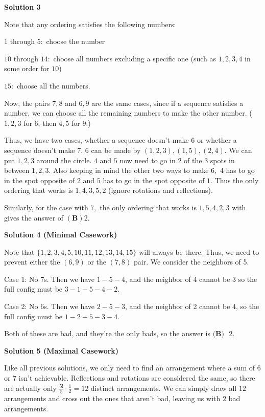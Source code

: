 \begin{enumerate}
 



\textbf{Solution 3}

Note that any ordering satisfies the following numbers:

 $1$ through $5:$ choose the number

 $10$ through $14:$ choose all numbers excluding a specific one (such as $1, 2, 3, 4$ in some order for $10$)

 $15:$ choose all the numbers.

 Now, the pairs $7, 8$ and $6, 9$ are the same cases, since if a sequence satisfies a number, we can choose all the remaining numbers to make the other number. ($1, 2, 3$ for $6$, then $4, 5$ for $9$.)

 Thus, we have two cases, whether a sequence doesn't make $6$ or whether a sequence doesn't make $7.$
$6$ can be made by $(1,2,3), (1, 5), (2, 4).$ We can put $1, 2, 3$ around the circle. $4$ and $5$ now need to go in $2$ of the $3$ spots in between $1, 2, 3.$ Also keeping in mind the other two ways to make $6,$ $4$ has to go in the spot opposite of $2$ and $5$ has to go in the spot opposite of $1.$ Thus the only ordering that works is $1, 4, 3, 5, 2$ (ignore rotations and reflections).

 Similarly, for the case with $7,$ the only ordering that works is $1, 5, 4, 2, 3$ with gives the answer of $\mathbf{(B) }2.$




\textbf{Solution 4 (Minimal Casework)}

Note that $\{1,2,3,4,5,10,11,12,13,14,15\}$ will always be there. Thus, we need to prevent either the $(6,9)$ or the $(7,8)$ pair. We consider the neighbors of 5. 

 Case 1: No 7s. Then we have $1-5-4$, and the neighbor of 4 cannot be 3 so the full config must be $3-1-5-4-2$. 

 Case 2: No 6s. Then we have $2-5-3$, and the neighbor of 2 cannot be 4, so the full config must be $1-2-5-3-4$. 

 Both of these are bad, and they're the only bads, so the answer is $\textbf{(B)} \text{ }2$.

 



\textbf{Solution 5 (Maximal Casework)}

Like all previous solutions, we only need to find an arrangement where a sum of $6$ or $7$ isn't achievable. Reflections and rotations are considered the same, so there are actually only $\frac{5!}{5} \cdot \frac{1}{2} = 12$ distinct arrangements. We can simply draw all $12$ arrangements and cross out the ones that aren't bad, leaving us with $\boxed{2}$ bad arrangements.


\end{enumerate}
